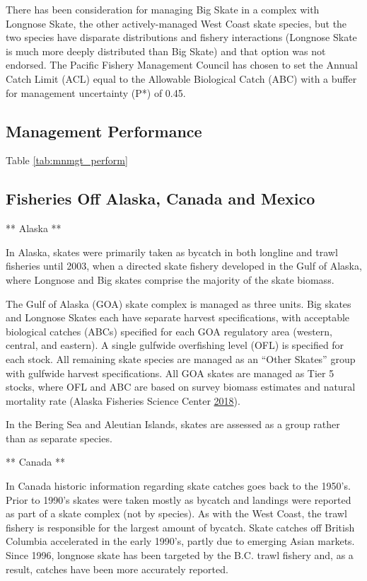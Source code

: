\documentclass[12pt,]{article}
\begin{document}
There has been consideration for managing Big Skate in a complex with
Longnose Skate, the other actively-managed West Coast skate species, but
the two species have disparate distributions and fishery interactions
(Longnose Skate is much more deeply distributed than Big Skate) and that
option was not endorsed. The Pacific Fishery Management Council has
chosen to set the Annual Catch Limit (ACL) equal to the Allowable
Biological Catch (ABC) with a buffer for management uncertainty (P*) of
0.45.

\hypertarget{management-performance-1}{%
\subsection{Management Performance}\label{management-performance-1}}

Table \ref{tab:mnmgt_perform}

\hypertarget{fisheries-off-alaska-canada-and-mexico}{%
\subsection{Fisheries Off Alaska, Canada and
Mexico}\label{fisheries-off-alaska-canada-and-mexico}}

** Alaska **

In Alaska, skates were primarily taken as bycatch in both longline and
trawl fisheries until 2003, when a directed skate fishery developed in
the Gulf of Alaska, where Longnose and Big skates comprise the majority
of the skate biomass.

The Gulf of Alaska (GOA) skate complex is managed as three units. Big
skates and Longnose Skates each have separate harvest specifications,
with acceptable biological catches (ABCs) specified for each GOA
regulatory area (western, central, and eastern). A single gulfwide
overfishing level (OFL) is specified for each stock. All remaining skate
species are managed as an ``Other Skates'' group with gulfwide harvest
specifications. All GOA skates are managed as Tier 5 stocks, where OFL
and ABC are based on survey biomass estimates and natural mortality rate
(Alaska Fisheries Science Center
\protect\hyperlink{ref-AFSC2018}{2018}).

In the Bering Sea and Aleutian Islands, skates are assessed as a group
rather than as separate species.

** Canada **

In Canada historic information regarding skate catches goes back to the
1950's. Prior to 1990's skates were taken mostly as bycatch and landings
were reported as part of a skate complex (not by species). As with the
West Coast, the trawl fishery is responsible for the largest amount of
bycatch. Skate catches off British Columbia accelerated in the early
1990's, partly due to emerging Asian markets. Since 1996, longnose skate
has been targeted by the B.C. trawl fishery and, as a result, catches
have been more accurately reported.
\end{document}
